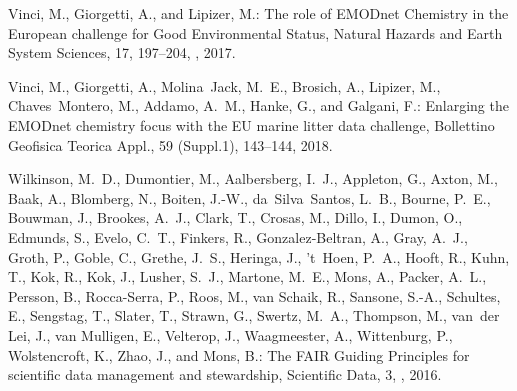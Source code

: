 \documentclass[essd,manuscript]{copernicus}
\begin{document}
\begin{thebibliography}{52}
Vinci, M., Giorgetti, A., and Lipizer, M.: {The role of EMODnet Chemistry in
  the European challenge for Good Environmental Status}, Natural Hazards and
  Earth System Sciences, 17, 197–204, , 2017.

Vinci, M., Giorgetti, A., Molina~Jack, M.~E., Brosich, A., Lipizer, M.,
  Chaves~Montero, M., Addamo, A.~M., Hanke, G., and Galgani, F.: {Enlarging the
  EMODnet chemistry focus with the EU marine litter data challenge}, Bollettino
  Geofisica Teorica Appl., 59 (Suppl.1), 143--144, 2018.

Wilkinson, M.~D., Dumontier, M., Aalbersberg, I.~J., Appleton, G., Axton, M.,
  Baak, A., Blomberg, N., Boiten, J.-W., da~Silva~Santos, L.~B., Bourne, P.~E.,
  Bouwman, J., Brookes, A.~J., Clark, T., Crosas, M., Dillo, I., Dumon, O.,
  Edmunds, S., Evelo, C.~T., Finkers, R., Gonzalez-Beltran, A., Gray, A.~J.,
  Groth, P., Goble, C., Grethe, J.~S., Heringa, J., 't~Hoen, P.~A., Hooft, R.,
  Kuhn, T., Kok, R., Kok, J., Lusher, S.~J., Martone, M.~E., Mons, A., Packer,
  A.~L., Persson, B., Rocca-Serra, P., Roos, M., van Schaik, R., Sansone,
  S.-A., Schultes, E., Sengstag, T., Slater, T., Strawn, G., Swertz, M.~A.,
  Thompson, M., van~der Lei, J., van Mulligen, E., Velterop, J., Waagmeester,
  A., Wittenburg, P., Wolstencroft, K., Zhao, J., and Mons, B.: The FAIR
  Guiding Principles for scientific data management and stewardship, Scientific
  Data, 3, , 2016.


\end{thebibliography}
\end{document}
